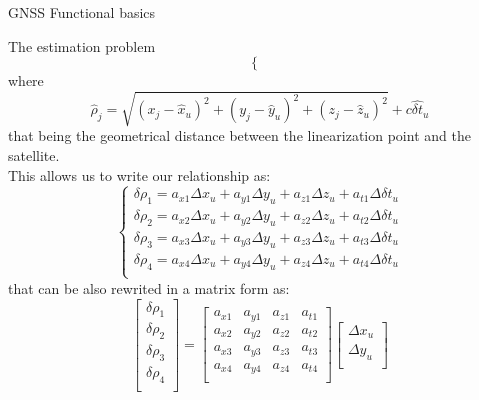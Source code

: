 \begin{section}{GNSS Functional basics}
\begin{subsection}{The estimation problem}
\begin{equation}
\begin{cases}
        \end{cases}
        \label{eq:GNSS linearized coefficients}
      \end{equation}
      where 
      \begin{equation*}
        \hat{\rho}_j = \sqrt{(x_j - \hat{x}_u)^2 + (y_j - \hat{y}_u)^2 + (z_j - \hat{z}_u)^2} + c\hat{\delta t}_u
      \end{equation*}
      that being the geometrical distance between the linearization point and the satellite.\\
      This allows us to write our relationship as:
      \begin{equation}
        \begin{cases}
          \delta \rho_1 = a_{x1}\Delta x_u + a_{y1}\Delta y_u + a_{z1}\Delta z_u + a_{t1}\Delta \delta t_u\\
          \delta \rho_2 = a_{x2}\Delta x_u + a_{y2}\Delta y_u + a_{z2}\Delta z_u + a_{t2}\Delta \delta t_u\\
          \delta \rho_3 = a_{x3}\Delta x_u + a_{y3}\Delta y_u + a_{z3}\Delta z_u + a_{t3}\Delta \delta t_u\\
          \delta \rho_4 = a_{x4}\Delta x_u + a_{y4}\Delta y_u + a_{z4}\Delta z_u + a_{t4}\Delta \delta t_u\\
        \end{cases}
        \end{equation}
        that can be also rewrited in a matrix form as:
        \begin{equation}
        \begin{bmatrix}
          \delta \rho_1\\
          \delta \rho_2\\
          \delta \rho_3\\
          \delta \rho_4\\
        \end{bmatrix}
        =
        \begin{bmatrix}
          a_{x1} & a_{y1} & a_{z1} & a_{t1}\\
          a_{x2} & a_{y2} & a_{z2} & a_{t2}\\
          a_{x3} & a_{y3} & a_{z3} & a_{t3}\\
          a_{x4} & a_{y4} & a_{z4} & a_{t4}\\
        \end{bmatrix}
        \begin{bmatrix}
          \Delta x_u\\
          \Delta y_u\\

\end{bmatrix}
\end{equation}
\end{subsection}
\end{section}
